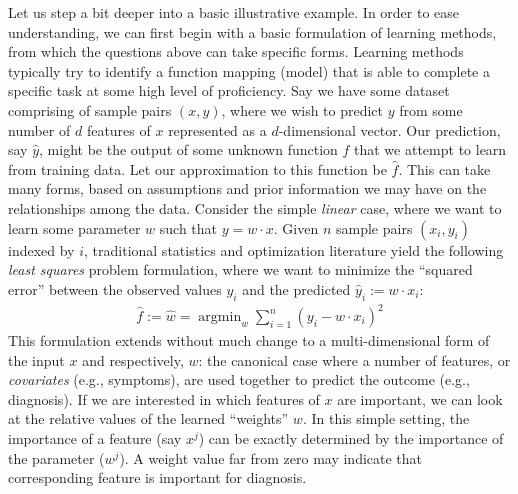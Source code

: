 
Let us step a bit deeper into a basic illustrative example. In order to ease understanding, we can first begin with a basic formulation of learning methods, from which the questions above can take specific forms. 
Learning methods typically  try to identify a function mapping (model) that is able to complete a specific task at some high level of proficiency. 
Say we have some dataset comprising of sample pairs $(x,y)$, where we wish to predict $y$ from some number of $d$ features of $x$ represented as a $d$-dimensional vector.
Our prediction, say $\hat{y}$, might be the output of some unknown function $f$ that we attempt to learn from training data. 
Let our approximation to this function be $\hat{f}$.
This can take many forms, 
based on assumptions and prior information we may have on the relationships among the data. 
Consider the simple \textit{linear} case,
where we want to learn some parameter $w$ such that $y = w\cdot x$. 
Given $n$ sample pairs $(x_i,y_i)$ indexed by $i$, traditional statistics and optimization literature yield the following \textit{least squares} problem formulation, where we want to minimize the ``squared error'' between the observed values $y_i$ and the predicted $\hat{y}_i:= w\cdot x_i$:
\begin{align}\label{eq:lq}
\hat{f}:=\hat{w} = \mathop{\arg\min}_{w} \sum_{i=1}^n (y_i - w\cdot x_i)^2
\end{align}
This formulation extends without much change to a multi-dimensional form of the input $x$ and respectively, $w$: the canonical case where a number of features, or \textit{covariates} (e.g., symptoms), are used together to predict the outcome (e.g., diagnosis). 
If we are interested in which features of $x$ are important, we can look at the relative values of the learned ``weights'' $w$. In this simple setting, the importance of a feature (say $x^j$) can be exactly determined by the importance of the parameter ($w^j$).
A weight value far from zero may indicate that corresponding feature is important for diagnosis.

